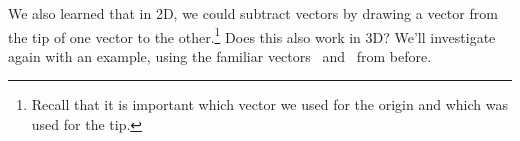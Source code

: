{\begin{myfigure}
\begin{center}
\end{center}
\label{fig:add_3D}
\end{myfigure}
\baselineskip}

\medskip

We also learned that in 2D, we could subtract vectors by drawing a vector from the tip of one vector to the other.\footnote{Recall that it is important which vector we used for the origin and which was used for the tip.} Does this also work in 3D? We'll investigate again with an example, using the familiar vectors \vv\ and \vu\ from before.

\medskip

